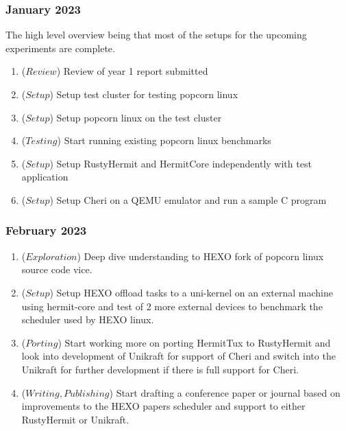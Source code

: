 \subsubsection{January 2023}
The high level overview being that most of the setups for the upcoming experiments
are complete. 
\begin{enumerate}
    \item (\(Review\)) Review of year 1 report submitted 
    \item (\(Setup\)) Setup test cluster for testing popcorn linux 
    \item (\(Setup\)) Setup popcorn linux on the test cluster
    \item (\(Testing\)) Start running existing popcorn linux benchmarks 
    \item (\(Setup\)) Setup RustyHermit and HermitCore independently with test application 
    \item (\(Setup\)) Setup Cheri on a QEMU emulator and run a sample C program 
  \end{enumerate} 


  \subsubsection{February 2023}
  \begin{enumerate}
    \item (\(Exploration\)) Deep dive understanding to HEXO fork of popcorn linux source code vice.
    \item (\(Setup\)) Setup HEXO offload tasks to a uni-kernel on an external machine using hermit-core 
    and test of 2 more external devices to benchmark the scheduler used by HEXO linux. 
    \item (\(Porting\)) Start working more on porting HermitTux to RustyHermit and look into 
    development of Unikraft for support of Cheri and switch into the Unikraft for further 
    development if there is full support for Cheri. 
    \item (\(Writing, Publishing\)) Start drafting a conference paper or journal based on improvements to the HEXO papers 
    scheduler and support to either RustyHermit or Unikraft. 
  \end{enumerate}

